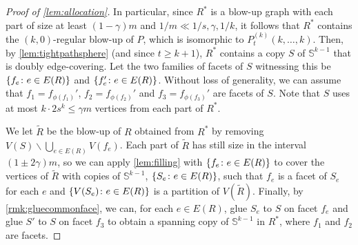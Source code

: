 \documentclass[12pt,reqno]{amsart}
\theoremstyle{plain}
\theoremstyle{definition}
\numberwithin{equation}{section}
\DeclarePairedDelimiter{\set}{\{}{\}}
\renewcommand{\ge}{\geqslant}
\renewcommand{\le}{\leqslant}
\renewcommand{\setminus}{\smallsetminus}
\newcommand{\bS}{\mathbb{S}}
\begin{document}
\begin{proof}[Proof of \cref{lem:allocation}]
		In particular, since $R^\ast$ is a blow-up graph with each part of size at least $(1-\gamma)m$ and $1/m \ll 1/s, \gamma, 1/k$, it follows that $R^\ast$ contains the $(k,0)$-regular blow-up of $P$, which is isomorphic to $P_{t}^{(k)}(k,\dots,k)$.
		Then, by \cref{lem:tightpathsphere} (and since $t \ge k+1$), $R^\ast$ contains a copy $S$ of $\bS^{k - 1}$ that is doubly edge-covering. Let the two families of facets of $S$ witnessing this be $\set{f_e \colon e \in E(R)}$ and $\set{f'_e \colon e \in E(R)}$.
		Without loss of generality, we can assume that $f_1 = f_{\phi(f_1)}'$, $f_2 = f_{\phi(f_2)}'$ and $f_3 = f_{\phi(f_3)}'$ are facets of $S$.
		Note that $S$ uses at most $k \cdot 2s^{k} \le \gamma m$ vertices from each part of $R^\ast$.
		
		We let $\tilde R$ be the blow-up of $R$ obtained from $R^\ast$ by removing $V(S) \setminus \bigcup_{e \in E(R)} V(f_e)$.
		Each part of $\tilde{R}$ has still size in the interval $(1 \pm 2\gamma)m$, so we can apply \cref{lem:filling} with $\set{ f_e \colon e\in E(R) }$ to cover the vertices of $\tilde R$ with copies of $\bS^{k - 1}$, $\set{S_e \colon e \in E(R) }$, such that $f_e$ is a facet of $S_e$ for each $e$ and $\set{V(S_e) \colon e \in E(R)}$ is a partition of $V(\tilde{R})$.
		Finally, by \cref{rmk:gluecommonface}, we can, for each $e \in E(R)$, glue $S_e$ to $S$ on facet $f_e$ and glue $S'$ to $S$ on facet $f_3$ to obtain a spanning copy of $\bS^{k - 1}$ in $R^\ast$, where $f_1$ and $f_2$ are facets.
	\end{proof}
	
\end{document}
